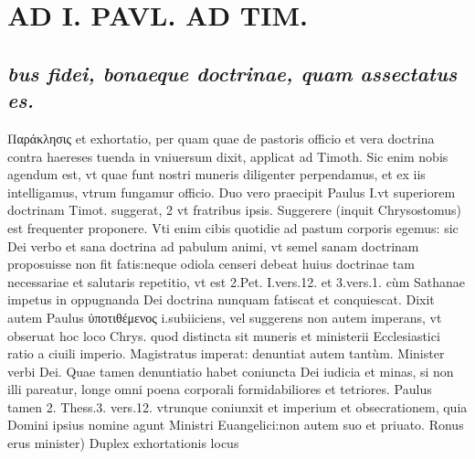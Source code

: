 \documentclass{article}
\begin{document}
\begin{pages}
\subsection*{\textit{}}
\section*{AD I. PAVL. AD TIM. }
\marginpar{[ p.200 ]}
{}
\subsection*{\textit{bus fidei, bonaeque doctrinae, quam assectatus es. }}\pstart Παράκλησις et exhortatio, per quam quae de pastoris officio et vera doctrina contra haereses tuenda in vniuersum dixit, applicat ad Timoth. Sic enim nobis agendum est, vt quae funt nostri muneris diligenter perpendamus, et ex iis intelligamus, vtrum fungamur officio. Duo vero praecipit Paulus I.vt superiorem doctrinam Timot. suggerat, 2 vt fratribus ipsis. Suggerere (inquit Chrysostomus) est frequenter proponere. Vti enim cibis quotidie ad pastum corporis egemus: sic Dei verbo et sana doctrina ad pabulum animi, vt semel sanam doctrinam proposuisse non fit fatis:neque  odiola censeri debeat huius doctrinae tam necessariae et salutaris repetitio, vt est 2.Pet. I.vers.12. et 3.vers.1. cùm Sathanae impetus in oppugnanda Dei doctrina nunquam fatiscat et conquiescat.  \pend\pstart Dixit autem Paulus ὐποτιθέμενος i.subiiciens, vel suggerens non autem imperans, vt obseruat hoc loco Chrys. quod distincta sit muneris et ministerii Ecclesiastici ratio a ciuili imperio. Magistratus imperat: denuntiat autem tantùm. Minister verbi Dei. Quae tamen denuntiatio habet coniuncta Dei iudicia et minas, si non illi pareatur, longe omni poena corporali formidabiliores et tetriores. Paulus tamen 2. Thess.3. vers.12. vtrunque  coniunxit et imperium et obsecrationem, quia Domini ipsius nomine agunt Ministri Euangelici:non autem suo et priuato.  \pend\pstart Ronus erus minister) Duplex exhortationis locus  \pend

\end{pages}
\end{document}
